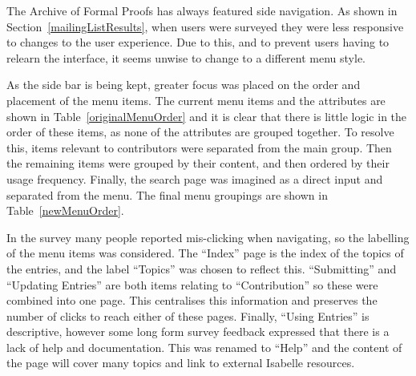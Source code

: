 \documentclass[bsc,frontabs,oneside,singlespacing,parskip,deptreport,logo]{infthesis}
\begin{document}
The Archive of Formal Proofs has always featured side navigation. As shown in Section~\ref{mailingListResults}, when users were surveyed they were less responsive to changes to the user experience. Due to this, and to prevent users having to relearn the interface, it seems unwise to change to a different menu style. 

As the side bar is being kept, greater focus was placed on the order and placement of the menu items. The current menu items and the attributes are shown in Table~\ref{originalMenuOrder} and it is clear that there is little logic in the order of these items, as none of the attributes are grouped together. To resolve this, items relevant to contributors were separated from the main group. Then the remaining items were grouped by their content, and then ordered by their usage frequency. Finally, the search page was imagined as a direct input and separated from the menu. The final menu groupings are shown in Table~\ref{newMenuOrder}.


In the survey many people reported mis-clicking when navigating, so the labelling of the menu items was considered. The ``Index'' page is the index of the topics of the entries, and the label ``Topics'' was chosen to reflect this. ``Submitting'' and ``Updating Entries'' are both items relating to ``Contribution'' so these were combined into one page. This centralises this information and preserves the number of clicks to reach either of these pages. Finally, ``Using Entries'' is descriptive, however some long form survey feedback expressed that there is a lack of help and documentation. This was renamed to ``Help'' and the content of the page will cover many topics and link to external Isabelle resources.
\end{document}
